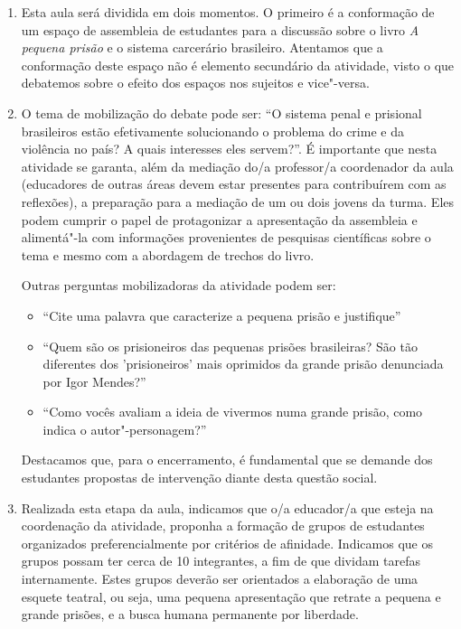 \documentclass[11pt]{extarticle}
\begin{document}
\begin{enumerate}
\item Esta aula será dividida em dois momentos. O
primeiro é a conformação de um espaço de assembleia de estudantes para a
discussão sobre o livro \emph{A pequena prisão} e o sistema carcerário
brasileiro. Atentamos que a conformação deste espaço não é elemento
secundário da atividade, visto o que debatemos sobre o efeito dos
espaços nos sujeitos e vice"-versa. 

\item O tema de mobilização do debate pode
ser: ``O sistema penal e prisional brasileiros estão efetivamente
solucionando o problema do crime e da violência no país? A quais
interesses eles servem?''. É importante que nesta atividade se garanta, além
da mediação do/a professor/a coordenador da aula (educadores de outras áreas
devem estar presentes para contribuírem com as reflexões), a
preparação para a mediação de um ou dois jovens da turma. Eles podem
cumprir o papel de protagonizar a apresentação da assembleia e
alimentá"-la com informações provenientes de pesquisas científicas sobre
o tema e mesmo com a abordagem de trechos do livro. 

Outras perguntas
mobilizadoras da atividade podem ser:

\begin{itemize}
\item ``Cite uma palavra que caracterize a
pequena prisão e justifique''

\item ``Quem são os prisioneiros das pequenas
prisões brasileiras? São tão diferentes dos 'prisioneiros' mais
oprimidos da grande prisão denunciada por Igor Mendes?''

\item ``Como vocês
avaliam a ideia de vivermos numa grande prisão, como indica o
autor"-personagem?'' 
\end{itemize}

Destacamos que, para o encerramento, é fundamental que
se demande dos estudantes propostas de intervenção diante desta questão
social.

\item Realizada esta etapa da aula, indicamos que o/a educador/a que esteja na
coordenação da atividade, proponha a formação de grupos de estudantes
organizados preferencialmente por critérios de afinidade. Indicamos que
os grupos possam ter cerca de 10 integrantes, a fim de que dividam
tarefas internamente. Estes grupos deverão ser orientados a elaboração
de uma esquete teatral, ou seja, uma pequena apresentação que retrate a
pequena e grande prisões, e a busca humana permanente por liberdade.


\end{enumerate}
\end{document}
